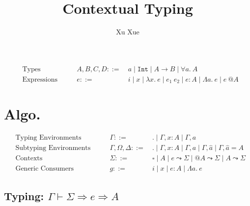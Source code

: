 \documentclass[9pt]{article}
\title{Contextual Typing}
\author{Xu Xue}
\begin{document}
\maketitle

\begin{align*}
&\text{Types} \quad\quad &A, B, C, D ::=&~ a \mid \mathtt{Int} \mid A \rightarrow B \mid \forall a.~A\\
&\text{Expressions} \quad \quad &e::=&~ i \mid x \mid \lambda x . ~e \mid e_1~e_2 \mid e : A \mid \Lambda a.~e \mid e ~@ A
\end{align*}

\section{Algo.}

\begin{align*}
&\text{Typing Environments} \quad\quad &\Gamma::=&~ . \mid \Gamma, x : A \mid \Gamma, a\\
&\text{Subtyping Environments} \quad\quad &\Gamma, \Omega, \Delta ::=&~ . \mid \Gamma, x : A \mid \Gamma, a \mid \Gamma , \hat{a} \mid \Gamma, \hat{a} = A\\
    &\text{Contexts} \quad\quad &\Sigma ::=&~  \square  \mid A \mid \boxed{e} \leadsto \Sigma \mid @A \leadsto \Sigma \mid \boxed{A} \leadsto \Sigma\\
    &\text{Generic Consumers} \quad \quad &g::=&~ i \mid x \mid e : A \mid \Lambda a.~e
\end{align*}

\subsection{Typing: $\Gamma \vdash \Sigma \Rightarrow e \Rightarrow A$}
\end{document}
